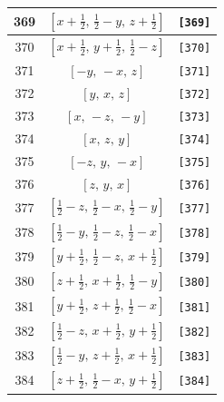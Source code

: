 \documentclass[fleqn,8pt]{jsarticle}
\begin{document}
\begin{longtable}{ccc}
369 & $\left[ x + \frac{1}{2},\, \frac{1}{2} - y,\, z + \frac{1}{2} \right]$ & {\tt [369]} \\ \hline
370 & $\left[ x + \frac{1}{2},\, y + \frac{1}{2},\, \frac{1}{2} - z \right]$ & {\tt [370]} \\ \hline
371 & $\left[ - y,\, - x,\, z \right]$ & {\tt [371]} \\ \hline
372 & $\left[ y,\, x,\, z \right]$ & {\tt [372]} \\ \hline
373 & $\left[ x,\, - z,\, - y \right]$ & {\tt [373]} \\ \hline
374 & $\left[ x,\, z,\, y \right]$ & {\tt [374]} \\ \hline
375 & $\left[ - z,\, y,\, - x \right]$ & {\tt [375]} \\ \hline
376 & $\left[ z,\, y,\, x \right]$ & {\tt [376]} \\ \hline
377 & $\left[ \frac{1}{2} - z,\, \frac{1}{2} - x,\, \frac{1}{2} - y \right]$ & {\tt [377]} \\ \hline
378 & $\left[ \frac{1}{2} - y,\, \frac{1}{2} - z,\, \frac{1}{2} - x \right]$ & {\tt [378]} \\ \hline
379 & $\left[ y + \frac{1}{2},\, \frac{1}{2} - z,\, x + \frac{1}{2} \right]$ & {\tt [379]} \\ \hline
380 & $\left[ z + \frac{1}{2},\, x + \frac{1}{2},\, \frac{1}{2} - y \right]$ & {\tt [380]} \\ \hline
381 & $\left[ y + \frac{1}{2},\, z + \frac{1}{2},\, \frac{1}{2} - x \right]$ & {\tt [381]} \\ \hline
382 & $\left[ \frac{1}{2} - z,\, x + \frac{1}{2},\, y + \frac{1}{2} \right]$ & {\tt [382]} \\ \hline
383 & $\left[ \frac{1}{2} - y,\, z + \frac{1}{2},\, x + \frac{1}{2} \right]$ & {\tt [383]} \\ \hline
384 & $\left[ z + \frac{1}{2},\, \frac{1}{2} - x,\, y + \frac{1}{2} \right]$ & {\tt [384]} \\
\end{longtable}
\end{document}
